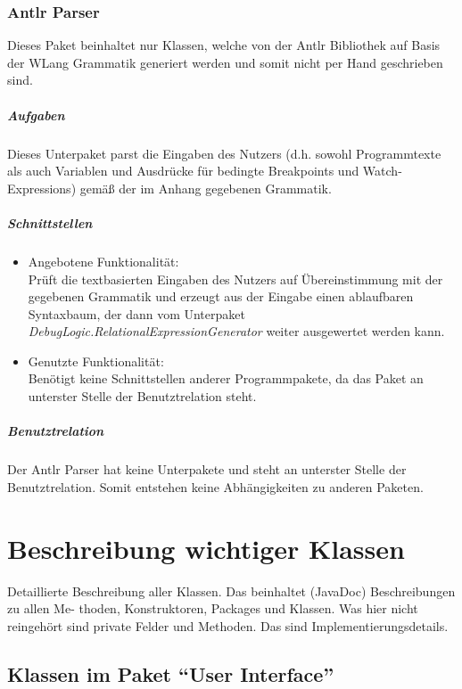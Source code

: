 \documentclass[parskip=full]{scrartcl}
\begin{document}
\subsubsection{Antlr Parser}
Dieses Paket beinhaltet nur Klassen, welche von der Antlr Bibliothek auf Basis der WLang Grammatik generiert werden und somit nicht per Hand geschrieben sind.
\subparagraph{Aufgaben}
Dieses Unterpaket parst die Eingaben des Nutzers (d.h. sowohl Programmtexte als auch Variablen und Ausdrücke für bedingte Breakpoints und Watch-Expressions) gemäß der im Anhang gegebenen Grammatik.

\subparagraph{Schnittstellen}
\begin{itemize}
\item Angebotene Funktionalität:\\
Prüft die textbasierten Eingaben des Nutzers auf Übereinstimmung mit der gegebenen Grammatik und erzeugt aus der Eingabe einen ablaufbaren Syntaxbaum, der dann vom Unterpaket \textit{DebugLogic.RelationalExpressionGenerator} weiter ausgewertet werden kann.
\item Genutzte Funktionalität:\\
Benötigt keine Schnittstellen anderer Programmpakete, da das Paket an unterster Stelle der Benutztrelation steht.
\end{itemize}
\subparagraph{Benutztrelation}
Der Antlr Parser hat keine Unterpakete und steht an unterster Stelle der Benutztrelation. Somit entstehen keine Abhängigkeiten zu anderen Paketen.

\section{Beschreibung wichtiger Klassen}\label{Klassen}
Detaillierte Beschreibung aller Klassen. Das beinhaltet (JavaDoc) Beschreibungen zu allen Me-
thoden, Konstruktoren, Packages und Klassen. Was hier nicht reingehört sind private Felder
und Methoden. Das sind Implementierungsdetails.

\subsection{Klassen im Paket \enquote{User Interface}}
\end{document}
